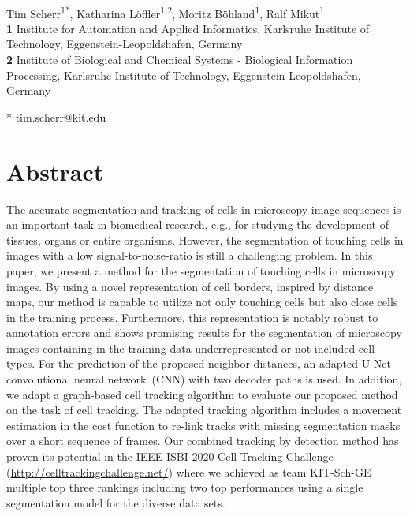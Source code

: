 \documentclass[10pt,letterpaper]{article}
\begin{document}
\vspace*{0.2in}

\begin{flushleft}
{\Large
\textbf{} }
\newline
\\
Tim Scherr\textsuperscript{1*},
Katharina Löffler\textsuperscript{1,2},
Moritz Böhland\textsuperscript{1},
Ralf Mikut\textsuperscript{1}
\\
\bigskip
\textbf{1} Institute for Automation and Applied Informatics, Karlsruhe Institute of Technology, Eggenstein-Leopoldshafen, Germany
\\
\textbf{2} Institute of Biological and Chemical Systems - Biological Information Processing, Karlsruhe Institute of Technology, Eggenstein-Leopoldshafen, Germany
\\
\bigskip











* tim.scherr@kit.edu

\end{flushleft}
\section*{Abstract}
The accurate segmentation and tracking of cells in microscopy image sequences is an important task in biomedical research, e.g., for studying the development of tissues, organs or entire organisms. However, the segmentation of touching cells in images with a low signal-to-noise-ratio is still a challenging problem. In this paper, we present a method for the segmentation of touching cells in microscopy images. By using a novel representation of cell borders, inspired by distance maps, our method is capable to utilize not only touching cells but also close cells in the training process. Furthermore, this representation is notably robust to annotation errors and shows promising results for the segmentation of microscopy images containing in the training data underrepresented or not included cell types. For the prediction of the proposed neighbor distances, an adapted U-Net convolutional neural network~(CNN) with two decoder paths is used. In addition, we adapt a graph-based cell tracking algorithm to evaluate our proposed method on the task of cell tracking. The adapted tracking algorithm includes a movement estimation in the cost function to re-link tracks with missing segmentation masks over a short sequence of frames. Our combined tracking by detection method has proven its potential in the IEEE ISBI 2020 Cell Tracking Challenge (\href{http://celltrackingchallenge.net/}{http://celltrackingchallenge.net/}) where we achieved as team KIT-Sch-GE multiple top three rankings including two top performances using a single segmentation model for the diverse data sets.
\end{document}
